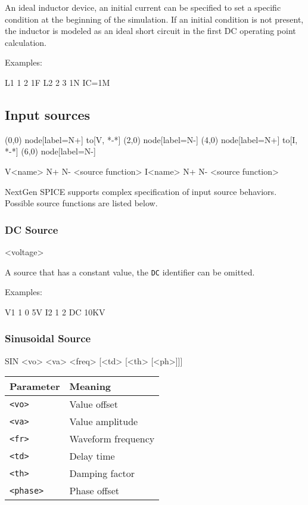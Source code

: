 An ideal inductor device, an initial current can be specified to set a specific condition at the beginning of the simulation. If an initial condition is not present, the inductor is modeled as an ideal short circuit in the first DC operating point calculation.

Examples: 

\begin{code}
L1 1 2 1F
L2 2 3 1N IC=1M
\end{code}

\subsection{Input sources}
\label{chap:spicecode-input-sources}

\begin{circuitdev}
	(0,0) node[label=N+]{} to[V, *-*] (2,0) node[label=N-]{}
	(4,0) node[label=N+]{} to[I, *-*] (6,0) node[label=N-]{}
\end{circuitdev}

\begin{code}
V<name> N+ N- <source function>
I<name> N+ N- <source function>
\end{code}

NextGen SPICE supports complex specification of input source behaviors. Possible source functions are listed below.

\subsubsection{DC Source}
\begin{code}
[DC] <voltage>
\end{code}

A source that has a constant value, the \texttt{DC} identifier can be omitted.

Examples:

\begin{code}
V1 1 0 5V
I2 1 2 DC 10KV
\end{code}

\subsubsection{Sinusoidal Source}

\begin{code}
SIN <vo> <va> <freq> [<td> [<th> [<ph>]]]
\end{code}

\begin{center}
\begin{tabular}{|l|l|}
	\hline
Parameter & Meaning \\ \hline \hline
\texttt{<vo>} & Value offset \\ \hline
\texttt{<va>} & Value amplitude \\ \hline
\texttt{<fr>} & Waveform frequency \\ \hline
\texttt{<td>} & Delay time \\ \hline
\texttt{<th>} & Damping factor \\ \hline
\texttt{<phase>} & Phase offset \\ \hline
\end{tabular}
\end{center}

